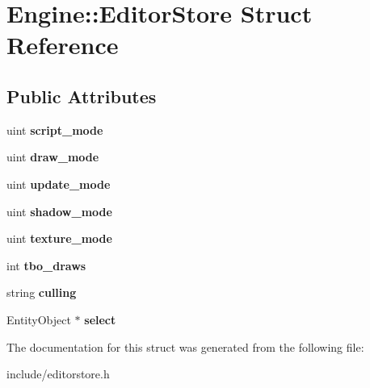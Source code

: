 \hypertarget{structEngine_1_1EditorStore}{}\section{Engine\+:\+:Editor\+Store Struct Reference}
\label{structEngine_1_1EditorStore}
\subsection*{Public Attributes}
\begin{DoxyCompactItemize}
\item 
\hypertarget{structEngine_1_1EditorStore_ae71310df3d29b539b288026be5736405}{}uint {\bfseries script\+\_\+mode}\label{structEngine_1_1EditorStore_ae71310df3d29b539b288026be5736405}

\item 
\hypertarget{structEngine_1_1EditorStore_a65b642e4ef92baffd8f0e72cae881ad6}{}uint {\bfseries draw\+\_\+mode}\label{structEngine_1_1EditorStore_a65b642e4ef92baffd8f0e72cae881ad6}

\item 
\hypertarget{structEngine_1_1EditorStore_ab5bc0c5d71b178fa3c4b46d59ddb1d3b}{}uint {\bfseries update\+\_\+mode}\label{structEngine_1_1EditorStore_ab5bc0c5d71b178fa3c4b46d59ddb1d3b}

\item 
\hypertarget{structEngine_1_1EditorStore_a8654bac30a30ac2f08cf2a76be13d6cb}{}uint {\bfseries shadow\+\_\+mode}\label{structEngine_1_1EditorStore_a8654bac30a30ac2f08cf2a76be13d6cb}

\item 
\hypertarget{structEngine_1_1EditorStore_a8c517f13358157dfe4f83c2bc2880416}{}uint {\bfseries texture\+\_\+mode}\label{structEngine_1_1EditorStore_a8c517f13358157dfe4f83c2bc2880416}

\item 
\hypertarget{structEngine_1_1EditorStore_a7273d42893d5c6499317ca35efdee9fc}{}int {\bfseries tbo\+\_\+draws}\label{structEngine_1_1EditorStore_a7273d42893d5c6499317ca35efdee9fc}

\item 
\hypertarget{structEngine_1_1EditorStore_abf2b21b2b7ef5e4376a4d7872f236eb4}{}string {\bfseries culling}\label{structEngine_1_1EditorStore_abf2b21b2b7ef5e4376a4d7872f236eb4}

\item 
\hypertarget{structEngine_1_1EditorStore_a86c12e4d7b5847bb7cf88b392fa6e0c1}{}Entity\+Object $\ast$ {\bfseries select}\label{structEngine_1_1EditorStore_a86c12e4d7b5847bb7cf88b392fa6e0c1}

\end{DoxyCompactItemize}


The documentation for this struct was generated from the following file\+:\begin{DoxyCompactItemize}
\item 
include/editorstore.\+h\end{DoxyCompactItemize}
